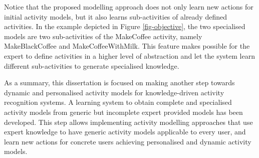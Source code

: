Notice that the proposed modelling approach does not only learn new actions for initial activity models, but it also learns sub-activities of already defined activities. In the example depicted in Figure \ref{fig-objective}, the two specialised models are two sub-activities of the MakeCoffee activity, namely MakeBlackCoffee and MakeCoffeeWithMilk. This feature makes possible for the expert to define activities in a higher level of abstraction and let the system learn different sub-activities to generate specialised knowledge. 

As a summary, this dissertation is focused on making another step towards dynamic and personalised activity models for knowledge-driven activity recognition systems. A learning system to obtain complete and specialised activity models from generic but incomplete expert provided models has been developed. This step allows implementing activity modelling approaches that use expert knowledge to have generic activity models applicable to every user, and learn new actions for concrete users achieving personalised and dynamic activity models. 